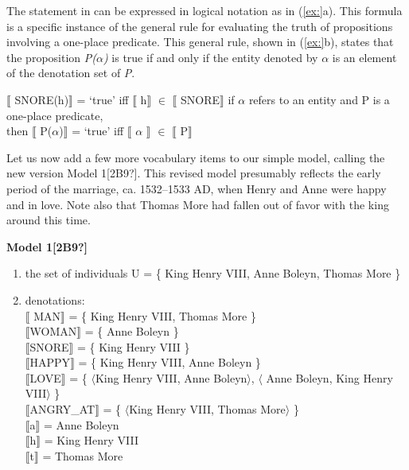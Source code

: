 The statement in  can be expressed in logical notation as in (\ref{ex:}a). This formula is a specific instance of the general rule for evaluating the truth of propositions involving a one-place predicate. This general rule, shown in (\ref{ex:}b), states that the proposition \textit{P($\alpha $)} is true if and only if the entity denoted by \textit{$\alpha $} is an element of the denotation set of \textit{P}.


\ea
\ea  $\llbracket$ SNORE(h)$\rrbracket$  = ‘true’  iff  $\llbracket$ h$\rrbracket$  ${\in}$ $\llbracket$ SNORE$\rrbracket$ 
\ex  if $\alpha $ refers to an entity and P is a one-place predicate,\\
  then  $\llbracket$ P($\alpha $)$\rrbracket$  = ‘true’  iff  $\llbracket$ $\alpha $ $\rrbracket$  ${\in}$ $\llbracket$ P$\rrbracket$ 
\z \z


Let us now add a few more vocabulary items to our simple model, calling the new version Model 1[2B9?]. This revised model presumably reflects the early period of the marriage, ca. 1532–1533 AD, when Henry and Anne were happy and in love. Note also that Thomas More had fallen out of favor with the king around this time.


\textbf{Model 1[2B9?]}

\begin{enumerate}
\item the set of individuals U = \{ King Henry VIII, Anne Boleyn, Thomas More \}
\item denotations\textsc{:\\
{}$\llbracket$ }\textsc{MAN}$\rrbracket$  = \{ King Henry VIII, Thomas More \}\\
\textsc{$\llbracket$}WOMAN$\rrbracket$  = \{ Anne Boleyn \}\\
\textsc{$\llbracket$}SNORE$\rrbracket$  = \{ King Henry VIII \}\\
\textsc{$\llbracket$}HAPPY$\rrbracket$  = \{ King Henry VIII, Anne Boleyn \}\\
\textsc{$\llbracket$}LOVE$\rrbracket$  = \{ $\langle$King Henry VIII, Anne Boleyn$\rangle$, $\langle$ Anne Boleyn, King Henry VIII$\rangle$ \}\\
\textsc{$\llbracket$}ANGRY\_AT$\rrbracket$  = \{ $\langle$King Henry VIII, Thomas More$\rangle$ \}\\
\textsc{$\llbracket$}a$\rrbracket$  = Anne Boleyn\\
\textsc{$\llbracket$}h$\rrbracket$  = King Henry VIII\\
\textsc{$\llbracket$}t$\rrbracket$  = Thomas More
\end{enumerate}

